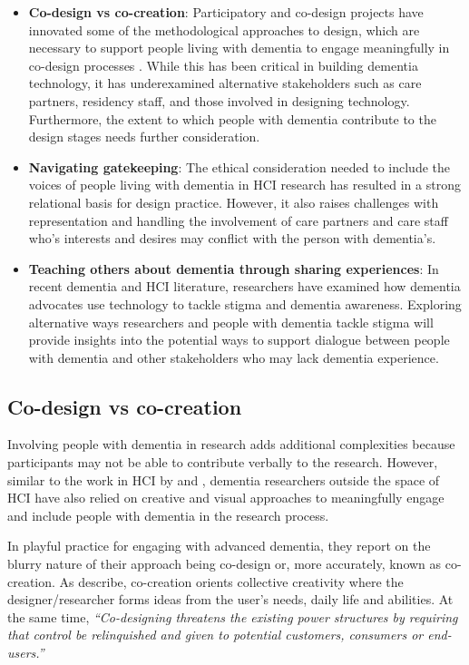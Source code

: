 \begin{itemize}
    \item \textbf{Co-design vs co-creation}: Participatory and co-design projects have innovated some of the methodological approaches to design, which are necessary to support people living with dementia to engage meaningfully in co-design processes \citep{branco_personalised_2017}. While this has been critical in building dementia technology, it has underexamined alternative stakeholders such as care partners, residency staff, and those involved in designing technology. Furthermore, the extent to which people with dementia contribute to the design stages needs further consideration.

    \item \textbf{Navigating gatekeeping}: The ethical consideration needed to include the voices of people living with dementia in HCI research has resulted in a strong relational basis for design practice. However, it also raises challenges with representation and handling the involvement of care partners and care staff who's interests and desires may conflict with the person with dementia's. 
    
    \item \textbf{Teaching others about dementia through sharing experiences}: In recent dementia and HCI literature, researchers have examined how dementia advocates use technology to tackle stigma and dementia awareness. Exploring alternative ways researchers and people with dementia tackle stigma will provide insights into the potential ways to support dialogue between people with dementia and other stakeholders who may lack dementia experience.
\end{itemize}

\subsection{Co-design vs co-creation}
Involving people with dementia in research adds additional complexities because participants may not be able to contribute verbally to the research. However, similar to the work in HCI by \cite{lazar_using_2014} and \cite{foley_student_2020}, dementia researchers outside the space of HCI have also relied on creative and visual approaches to meaningfully engage and include people with dementia in the research process.

In \cite{tsekleves2020engaging} playful practice for engaging with advanced dementia, they report on the blurry nature of their approach being co-design or, more accurately, known as co-creation. As \cite{sanders2008co} describe, co-creation orients collective creativity where the designer/researcher forms ideas from the user's needs, daily life and abilities. At the same time, \textit{``Co-designing threatens the existing power structures by requiring that control be relinquished and given to potential customers, consumers or end-users.''}

